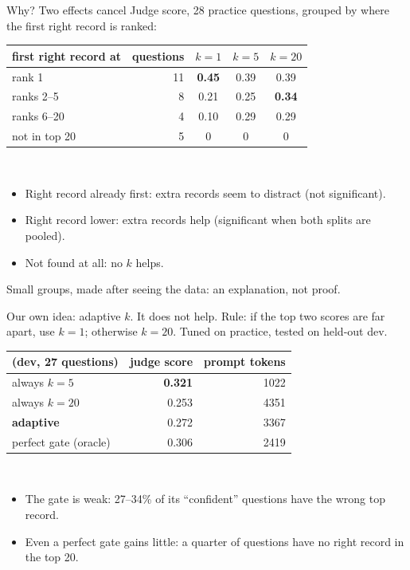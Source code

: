 \documentclass[aspectratio=169,12pt]{beamer}
\begin{document}
\begin{frame}{Why? Two effects cancel}
Judge score, 28 practice questions, grouped by where the first right record is ranked:\\[3mm]
\begin{tabular}{lrccc}
\toprule
first right record at & questions & $k=1$ & $k=5$ & $k=20$\\
\midrule
rank 1 & 11 & \textbf{0.45} & 0.39 & 0.39\\
ranks 2--5 & 8 & 0.21 & 0.25 & \textbf{0.34}\\
ranks 6--20 & 4 & 0.10 & 0.29 & 0.29\\
not in top 20 & 5 & 0 & 0 & 0\\
\bottomrule
\end{tabular}\\[4mm]
\begin{itemize}
\item Right record already first: extra records seem to distract (not significant).
\item Right record lower: extra records help (significant when both splits are pooled).
\item Not found at all: no $k$ helps.
\end{itemize}
{\small Small groups, made after seeing the data: an explanation, not proof.}
\end{frame}

\begin{frame}{Our own idea: adaptive $k$. It does not help.}
Rule: if the top two scores are far apart, use $k=1$; otherwise $k=20$. Tuned on practice, tested on held-out dev.\\[3mm]
\begin{tabular}{lrr}
\toprule
 (dev, 27 questions) & judge score & prompt tokens\\
\midrule
always $k=5$ & \textbf{0.321} & 1022\\
always $k=20$ & 0.253 & 4351\\
\textbf{adaptive} & 0.272 & 3367\\
perfect gate (oracle) & 0.306 & 2419\\
\bottomrule
\end{tabular}\\[4mm]
\begin{itemize}
\item The gate is weak: 27--34\% of its ``confident'' questions have the wrong top record.
\item Even a perfect gate gains little: a quarter of questions have no right record in the top 20.
\end{itemize}
\end{frame}
\end{document}
